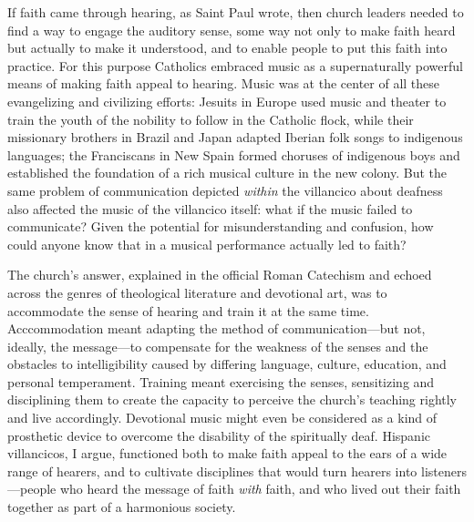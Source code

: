If faith came through hearing, as Saint Paul wrote, then church leaders needed
to find a way to engage the auditory sense, some way not only to make faith
heard but actually to make it understood, and to enable people to put this faith
into practice.
For this purpose Catholics embraced music as a supernaturally powerful means of
making faith appeal to hearing.
Music was at the center of all these evangelizing and civilizing efforts:
Jesuits in Europe used music and theater to train the youth of the nobility to
follow in the Catholic flock, while their missionary brothers in Brazil and
Japan adapted Iberian folk songs to indigenous languages; the Franciscans in New
Spain formed choruses of indigenous boys and established the foundation of a
rich musical culture in the new colony.%
    \Autocites
    {Castagna:JesuitsConversionBrazil}
    {Waterhouse:EarliestJapaneseContacts}
    {Candelaria:Psalmodia}
But the same problem of communication depicted \emph{within} the villancico
about deafness also affected the music of the villancico itself: what if the
music failed to communicate?
Given the potential for misunderstanding and confusion, how could anyone know
that  in a musical performance actually led to faith?

The church's answer, explained in the official Roman Catechism and echoed across
the genres of theological literature and devotional art, was to accommodate
the sense of hearing and train it at the same time.%
    \autocite{Catholic:Catechismus1567}
Acccommodation meant adapting the method of communication---but not, ideally,
the message---to compensate for the weakness of the senses and the obstacles to
intelligibility caused by differing language, culture, education, and personal
temperament. 
Training meant exercising the senses, sensitizing and disciplining them to
create the capacity to perceive the church's teaching rightly and live
accordingly.
Devotional music might even be considered as a kind of prosthetic device to
overcome the disability of the spiritually deaf.
Hispanic villancicos, I argue, functioned both to make faith appeal to the
ears of a wide range of hearers, and to cultivate disciplines that would turn
hearers into listeners---people who heard the message of faith \emph{with}
faith, and who lived out their faith together as part of a harmonious society.

